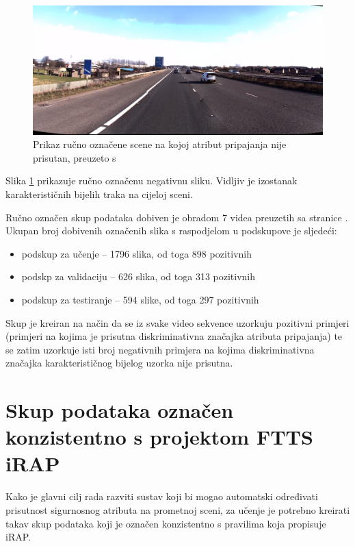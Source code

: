 \documentclass[times, utf8, diplomski, numeric]{fer}
\begin{document}
\begin{figure}[H]
\centering
\includegraphics[scale=0.15]{images/hand_labeled_negative.png}
\caption{Prikaz ručno označene scene na kojoj atribut pripajanja nije prisutan, preuzeto s \citep{url:ftts_irap}}
\label{img:hand_labeled_negative}
\end{figure}

\noindent Slika \ref{img:hand_labeled_negative} prikazuje ručno označenu negativnu sliku.
Vidljiv je izostanak karakterističnih bijelih traka na cijeloj sceni.

Ručno označen skup podataka dobiven je obradom 7 videa preuzetih sa stranice \citep{url:ftts_irap}. 
Ukupan broj dobivenih označenih slika s raspodjelom u podskupove je sljedeći:
\begin{itemize}
 \item podskup za učenje -- 1796 slika, od toga 898 pozitivnih
 \item podskp za validaciju -- 626 slika, od toga 313 pozitivnih
 \item podskup za testiranje -- 594 slike, od toga 297 pozitivnih
\end{itemize}

\noindent Skup je kreiran na način da se iz svake video sekvence uzorkuju pozitivni primjeri (primjeri na kojima je prisutna diskriminativna značajka atributa pripajanja) te se zatim uzorkuje isti broj negativnih primjera na kojima diskriminativna značajka karakterističnog bijelog uzorka nije prisutna.

\section{Skup podataka označen konzistentno s projektom FTTS iRAP}
Kako je glavni cilj rada razviti sustav koji bi mogao automatski određivati prisutnost sigurnosnog atributa na prometnoj sceni, za učenje je potrebno kreirati takav skup podataka koji je označen konzistentno s pravilima koja propisuje iRAP.
\end{document}

